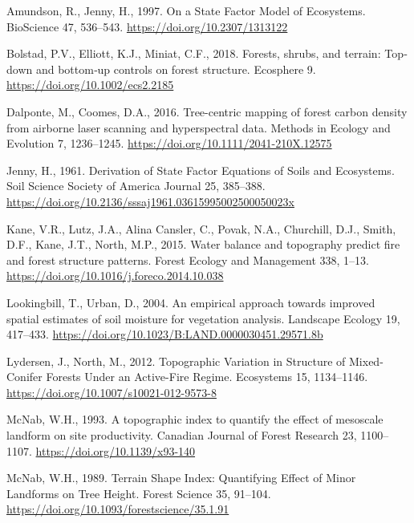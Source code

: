 \documentclass[
  12pt,
]{article}
\newlength{\cslentryspacing}
\begin{document}
\label{refs}
\setlength{\cslentryspacing}{0em}
\begin{CSLReferences}
Amundson, R., Jenny, H., 1997. On a {State} {Factor} {Model} of
{Ecosystems}. BioScience 47, 536--543.
\url{https://doi.org/10.2307/1313122}

Bolstad, P.V., Elliott, K.J., Miniat, C.F., 2018. Forests, shrubs, and
terrain: Top‐down and bottom‐up controls on forest structure. Ecosphere
9. \url{https://doi.org/10.1002/ecs2.2185}

Dalponte, M., Coomes, D.A., 2016. Tree-centric mapping of forest carbon
density from airborne laser scanning and hyperspectral data. Methods in
Ecology and Evolution 7, 1236--1245.
\url{https://doi.org/10.1111/2041-210X.12575}

Jenny, H., 1961. Derivation of {State} {Factor} {Equations} of {Soils}
and {Ecosystems}. Soil Science Society of America Journal 25, 385--388.
\url{https://doi.org/10.2136/sssaj1961.03615995002500050023x}

Kane, V.R., Lutz, J.A., Alina Cansler, C., Povak, N.A., Churchill, D.J.,
Smith, D.F., Kane, J.T., North, M.P., 2015. Water balance and topography
predict fire and forest structure patterns. Forest Ecology and
Management 338, 1--13.
\url{https://doi.org/10.1016/j.foreco.2014.10.038}

Lookingbill, T., Urban, D., 2004. An empirical approach towards improved
spatial estimates of soil moisture for vegetation analysis. Landscape
Ecology 19, 417--433.
\url{https://doi.org/10.1023/B:LAND.0000030451.29571.8b}

Lydersen, J., North, M., 2012. Topographic {Variation} in {Structure} of
{Mixed}-{Conifer} {Forests} {Under} an {Active}-{Fire} {Regime}.
Ecosystems 15, 1134--1146.
\url{https://doi.org/10.1007/s10021-012-9573-8}

McNab, W.H., 1993. A topographic index to quantify the effect of
mesoscale landform on site productivity. Canadian Journal of Forest
Research 23, 1100--1107. \url{https://doi.org/10.1139/x93-140}

McNab, W.H., 1989. Terrain {Shape} {Index}: {Quantifying} {Effect} of
{Minor} {Landforms} on {Tree} {Height}. Forest Science 35, 91--104.
\url{https://doi.org/10.1093/forestscience/35.1.91}

\end{CSLReferences}
\end{document}
